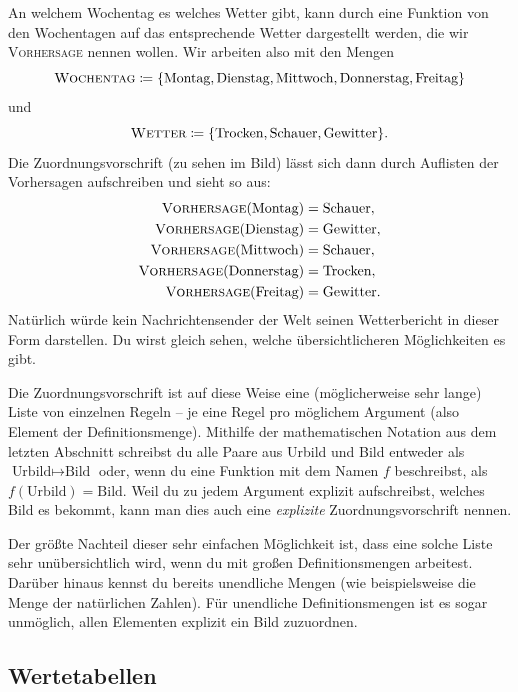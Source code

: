 \documentclass[../../main.tex]{subfiles}
\begin{document}
\begin{example}{}
    An welchem Wochentag es welches Wetter gibt, kann durch eine Funktion von den Wochentagen auf das entsprechende Wetter dargestellt werden, die wir \textsc{Vorhersage} nennen wollen. Wir arbeiten also mit den Mengen \[\textsc{Wochentag}\coloneqq\{\text{Montag},\text{Dienstag},\text{Mittwoch},\text{Donnerstag},\text{Freitag}\}\] und \[\textsc{Wetter}\coloneqq\{\text{Trocken},\text{Schauer},\text{Gewitter}\}.\]
    Die Zuordnungsvorschrift (zu sehen im Bild) lässt sich dann durch Auflisten der Vorhersagen aufschreiben und sieht so aus:
    \begin{align*}
        \textsc{Vorhersage}(\text{Montag})&=\text{Schauer},\\ \textsc{Vorhersage}(\text{Dienstag})&=\text{Gewitter},\\ \textsc{Vorhersage}(\text{Mittwoch})&=\text{Schauer},\\ \textsc{Vorhersage}(\text{Donnerstag})&=\text{Trocken},\\ \textsc{Vorhersage}(\text{Freitag})&=\text{Gewitter}.
    \end{align*}
    Natürlich würde kein Nachrichtensender der Welt seinen Wetterbericht in dieser Form darstellen. Du wirst gleich sehen, welche übersichtlicheren Möglichkeiten es gibt.
\end{example}

Die Zuordnungsvorschrift ist auf diese Weise eine (möglicherweise sehr lange) Liste von einzelnen Regeln -- je eine Regel pro möglichem Argument (also Element der Definitionsmenge).
Mithilfe der mathematischen Notation aus dem letzten Abschnitt schreibst du alle Paare aus Urbild und Bild entweder als \mbox{$\text{Urbild}\mapsto\text{Bild}$} oder, wenn du eine Funktion mit dem Namen $f$ beschreibst, als \mbox{$f(\text{Urbild})=\text{Bild}$}. Weil du zu jedem Argument explizit aufschreibst, welches Bild es bekommt, kann man dies auch eine \emph{explizite} Zuordnungsvorschrift nennen.

Der größte Nachteil dieser sehr einfachen Möglichkeit ist, dass eine solche Liste sehr unübersichtlich wird, wenn du mit großen Definitionsmengen arbeitest. Darüber hinaus kennst du bereits unendliche Mengen (wie beispielsweise die Menge \Natural{} der natürlichen Zahlen). Für unendliche Definitionsmengen ist es sogar unmöglich, allen Elementen explizit ein Bild zuzuordnen.

\subsection{Wertetabellen}
\label{sec:abbildungen_wertetabellen}
\end{document}
